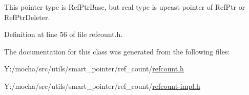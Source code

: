 This pointer type is RefPtrBase, but real type is upcast pointer of RefPtr or RefPtrDeleter. 



Definition at line 56 of file refcount.h.



The documentation for this class was generated from the following files:\begin{DoxyCompactItemize}
\item 
Y:/mocha/src/utils/smart\_\-pointer/ref\_\-count/\hyperlink{refcount_8h}{refcount.h}\item 
Y:/mocha/src/utils/smart\_\-pointer/ref\_\-count/\hyperlink{refcount-impl_8h}{refcount-\/impl.h}\end{DoxyCompactItemize}
